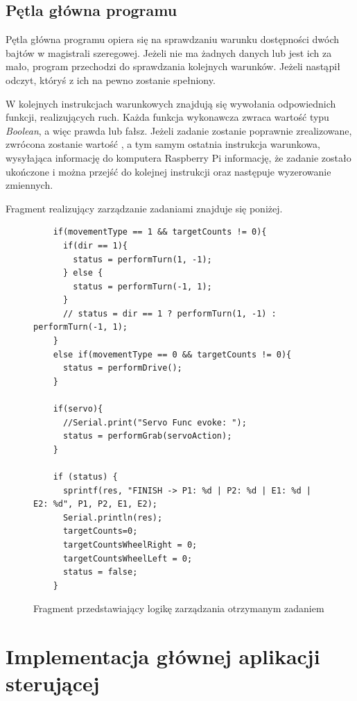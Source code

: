 \subsection{Pętla główna programu}

Pętla główna programu opiera się na sprawdzaniu warunku dostępności dwóch bajtów w magistrali szeregowej. Jeżeli nie ma żadnych danych lub jest ich za mało, program przechodzi do sprawdzania kolejnych warunków. Jeżeli nastąpił odczyt, któryś z ich na pewno zostanie spełniony. 

W kolejnych instrukcjach warunkowych znajdują się wywołania odpowiednich funkcji, realizujących ruch. Każda funkcja wykonawcza zwraca wartość typu \textit{Boolean}, a więc prawda lub fałsz. Jeżeli zadanie zostanie poprawnie zrealizowane, zwrócona zostanie wartość , a tym samym ostatnia instrukcja warunkowa, wysyłająca informację do komputera Raspberry Pi informację, że zadanie zostało ukończone i można przejść do kolejnej instrukcji oraz następuje wyzerowanie zmiennych. 

Fragment realizujący zarządzanie zadaniami znajduje się poniżej. 

\begin{figure}[h!]
  \centering
  \begin{lstlisting}
    if(movementType == 1 && targetCounts != 0){
      if(dir == 1){
        status = performTurn(1, -1);
      } else {
        status = performTurn(-1, 1);
      }
      // status = dir == 1 ? performTurn(1, -1) : performTurn(-1, 1);
    }
    else if(movementType == 0 && targetCounts != 0){
      status = performDrive();
    }
    
    if(servo){
      //Serial.print("Servo Func evoke: ");
      status = performGrab(servoAction);
    }
  
    if (status) {
      sprintf(res, "FINISH -> P1: %d | P2: %d | E1: %d | E2: %d", P1, P2, E1, E2);
      Serial.println(res);
      targetCounts=0;
      targetCountsWheelRight = 0;
      targetCountsWheelLeft = 0;
      status = false;
    }
  \end{lstlisting}
  \caption{Fragment przedstawiający logikę zarządzania otrzymanym zadaniem}
  \label{fig:manage-ex}
\end{figure}

\clearpage

\section{Implementacja głównej aplikacji sterującej}

